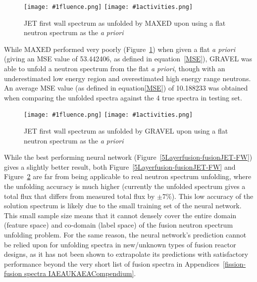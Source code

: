 \documentclass[a4paper, 12pt]{article}
\newcommand{\fluenceandactivities}[1]{
\texttt{[image: \#1fluence.png]}
\texttt{[image: \#1activities.png]}
}
\begin{document}
\begin{figure}[H]
\centering
    \fluenceandactivities{/home/ocean/Documents/GitHubDir/unfolding/unfolding/unfoldingsuite/neuralnetwork/realinputEarlyStopping/comparison/real_fusion_test_maxed_test_000_}
    \caption{JET first wall spectrum as unfolded by MAXED upon using a flat neutron spectrum as the \emph{a priori}}\label{maxed_flat_a_priori_JET}
\end{figure}
    
While MAXED performed very poorly (Figure~\ref{maxed_flat_a_priori_JET}) when given a flat \emph{a priori} (giving an MSE value of 53.442406, as defined in equation~\ref{MSE}), GRAVEL was able to unfold a neutron spectrum from the flat \emph{a priori}, though with an underestimated low energy region and overestimated high energy range neutrons.
An average MSE value (as defined in equation\ref{MSE}) of 10.188233 was obtained when comparing the unfolded spectra against the 4 true spectra in testing set.

\begin{figure}
\centering
    \fluenceandactivities{/home/ocean/Documents/GitHubDir/unfolding/unfolding/unfoldingsuite/neuralnetwork/realinputEarlyStopping/comparison/real_fusion_test_gravel_test_001_}
    \caption{JET first wall spectrum as unfolded by GRAVEL upon using a flat neutron spectrum as the \emph{a priori}}\label{gravel_flat_a_priori_JET}
\end{figure}

While the best performing neural network (Figure~\ref{5Layerfusion-fusionJET-FW}) gives a slightly better result, both Figure~\ref{5Layerfusion-fusionJET-FW} and Figure~\ref{gravel_flat_a_priori_JET} are far from being applicable to real neutron spectrum unfolding, where the unfolding accuracy is much higher (currently the unfolded spectrum gives a total flux that differs from measured total flux by $\pm 7\%$\cite{bethColling_TBMD}). This low accuracy of the solution spectrum is likely due to the small training set of the neural network. This small sample size means that it cannot densely cover the entire domain (feature space) and co-domain (label space) of the fusion neutron spectrum unfolding problem. For the same reason, the neural network's prediction cannot be relied upon for unfolding spectra in new/unknown types of fusion reactor designs, as it has not been shown to extrapolate its predictions with satisfactory performance beyond the very short list of fusion spectra in Appendices~\ref{fission-fusion spectra IAEAUKAEACompendium}.
\end{document}
